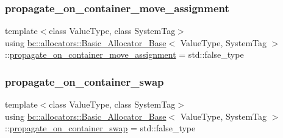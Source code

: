 \subsubsection{\texorpdfstring{propagate\+\_\+on\+\_\+container\+\_\+move\+\_\+assignment}{propagate\_on\_container\_move\_assignment}}
{\footnotesize\ttfamily template$<$class Value\+Type, class System\+Tag$>$ \\
using \hyperlink{structbc_1_1allocators_1_1Basic__Allocator__Base}{bc\+::allocators\+::\+Basic\+\_\+\+Allocator\+\_\+\+Base}$<$ Value\+Type, System\+Tag $>$\+::\hyperlink{structbc_1_1allocators_1_1Basic__Allocator__Base_a7c726fe1953f8dcb66e515edcf0d52ef}{propagate\+\_\+on\+\_\+container\+\_\+move\+\_\+assignment} =  std\+::false\+\_\+type}

\mbox{\label{structbc_1_1allocators_1_1Basic__Allocator__Base_a43d9999061677b23d0d03a56427e39f5}} 
\subsubsection{\texorpdfstring{propagate\+\_\+on\+\_\+container\+\_\+swap}{propagate\_on\_container\_swap}}
{\footnotesize\ttfamily template$<$class Value\+Type, class System\+Tag$>$ \\
using \hyperlink{structbc_1_1allocators_1_1Basic__Allocator__Base}{bc\+::allocators\+::\+Basic\+\_\+\+Allocator\+\_\+\+Base}$<$ Value\+Type, System\+Tag $>$\+::\hyperlink{structbc_1_1allocators_1_1Basic__Allocator__Base_a43d9999061677b23d0d03a56427e39f5}{propagate\+\_\+on\+\_\+container\+\_\+swap} =  std\+::false\+\_\+type}

\mbox{\label{structbc_1_1allocators_1_1Basic__Allocator__Base_a9900b1de8ba282c40f6b5c3576f39b35}} 
